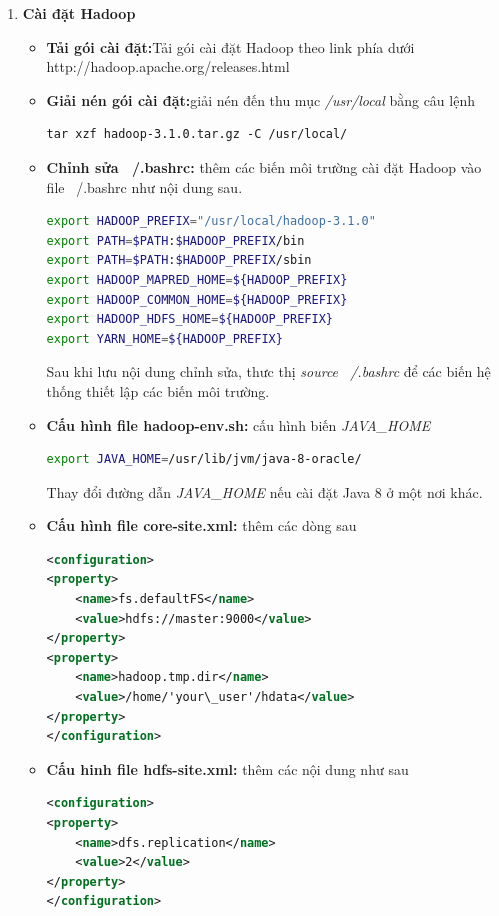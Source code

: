 \begin{enumerate}
\begin{itemize}
			\end{itemize}
			\item \textbf{Cài đặt Hadoop}
			\begin{itemize}
				\item \textbf{Tải gói cài đặt:}Tải gói cài đặt Hadoop theo link phía dưới\\
				http://hadoop.apache.org/releases.html
				\item \textbf{Giải nén gói cài đặt:}giải nén đến thu mục \textit{/usr/local} bằng câu lệnh
				\begin{lstlisting}
tar xzf hadoop-3.1.0.tar.gz -C /usr/local/
				\end{lstlisting}
				\item \textbf{Chỉnh sửa ~/.bashrc: }thêm các biến môi trường cài đặt Hadoop vào file ~/.bashrc như nội dung sau.
				\pagebreak
				\begin{lstlisting}[language=bash]
export HADOOP_PREFIX="/usr/local/hadoop-3.1.0"
export PATH=$PATH:$HADOOP_PREFIX/bin
export PATH=$PATH:$HADOOP_PREFIX/sbin
export HADOOP_MAPRED_HOME=${HADOOP_PREFIX}
export HADOOP_COMMON_HOME=${HADOOP_PREFIX}
export HADOOP_HDFS_HOME=${HADOOP_PREFIX}
export YARN_HOME=${HADOOP_PREFIX}
				\end{lstlisting}
				Sau khi lưu nội dung chỉnh sửa, thưc thị \textit{source ~/.bashrc} để các biến hệ thống thiết lập các biến môi trường.
				\item \textbf{Cấu hình file hadoop-env.sh: }cấu hình biến \textit{JAVA\_HOME}
				\begin{lstlisting}[language=bash]
export JAVA_HOME=/usr/lib/jvm/java-8-oracle/
				\end{lstlisting}
				Thay đổi đường dẫn \textit{JAVA\_HOME} nếu cài đặt Java 8 ở một nơi khác.
				\item \textbf{Cấu hình file core-site.xml: }thêm các dòng sau
				\begin{lstlisting}[language=XML]
<configuration>
<property>
	<name>fs.defaultFS</name>
	<value>hdfs://master:9000</value>
</property>
<property>
	<name>hadoop.tmp.dir</name>
	<value>/home/'your\_user'/hdata</value>
</property>
</configuration>
				\end{lstlisting}
				\item \textbf{Cấu hinh file hdfs-site.xml: }thêm các nội dung như sau
				\begin{lstlisting}[language=XML]
<configuration>
<property>
	<name>dfs.replication</name>
	<value>2</value>
</property>
</configuration>
				\end{lstlisting}

\end{itemize}
\end{enumerate}
